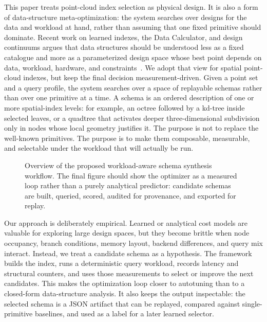 This paper treats point-cloud index selection as physical design. It is also a form of data-structure meta-optimization: the system searches over designs for the data and workload at hand, rather than assuming that one fixed primitive should dominate. Recent work on learned indexes, the Data Calculator, and design continuums argues that data structures should be understood less as a fixed catalogue and more as a parameterized design space whose best point depends on data, workload, hardware, and constraints~\cite{kraska2018learned,idreos2018datacalculator,idreos2019learningkv}. We adopt that view for spatial point-cloud indexes, but keep the final decision measurement-driven. Given a point set and a query profile, the system searches over a space of replayable schemas rather than over one primitive at a time. A schema is an ordered description of one or more spatial-index levels: for example, an octree followed by a kd-tree inside selected leaves, or a quadtree that activates deeper three-dimensional subdivision only in nodes whose local geometry justifies it. The purpose is not to replace the well-known primitives. The purpose is to make them composable, measurable, and selectable under the workload that will actually be run.

\begin{figure}[t]
  \centering
  \caption{Overview of the proposed workload-aware schema synthesis workflow. The final figure should show the optimizer as a measured loop rather than a purely analytical predictor: candidate schemas are built, queried, scored, audited for provenance, and exported for replay.}
  \label{fig:pipeline}
\end{figure}

Our approach is deliberately empirical. Learned or analytical cost models are valuable for exploring large design spaces, but they become brittle when node occupancy, branch conditions, memory layout, backend differences, and query mix interact. Instead, we treat a candidate schema as a hypothesis. The framework builds the index, runs a deterministic query workload, records latency and structural counters, and uses those measurements to select or improve the next candidates. This makes the optimization loop closer to autotuning than to a closed-form data-structure analysis. It also keeps the output inspectable: the selected schema is a JSON artifact that can be replayed, compared against single-primitive baselines, and used as a label for a later learned selector.

